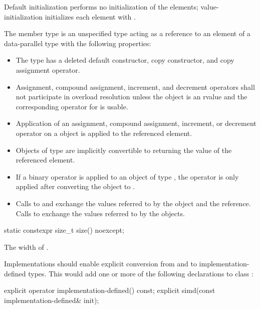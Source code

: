 \pnum Default initialization performs no initialization of the elements; value-initialization initializes each element with .

\pnum The member type  is an unspecified type acting as a reference to an element of a data-parallel type with the following properties:
\label{sec:reference type}
\begin{itemize}
  \item The type has a deleted default constructor, copy constructor, and copy assignment operator.

  \item Assignment, compound assignment, increment, and decrement operators shall not participate in overload resolution unless the  object is an rvalue and the corresponding operator for  is usable.

  \item Application of an assignment, compound assignment, increment, or decrement operator on a  object is applied to the referenced element.

  \item Objects of type  are implicitly convertible to  returning the value of the referenced element.

  \item If a binary operator is applied to an object of type , the operator is only applied after converting the  object to .

  \item Calls to  and  exchange the values referred to by the  object and the  reference.
  Calls to  exchange the values referred to by the  objects.
\end{itemize}

\begin{itemdecl}
static constexpr size_t size() noexcept;
\end{itemdecl}
\begin{itemdescr}
  \pnum\returns The width of \simd[<T, Abi>].
\end{itemdescr}

\pnum Implementations should enable explicit conversion from and to implementation-defined types.
This would add one or more of the following declarations to class \simd:
\begin{itemdecl}
  explicit operator implementation-defined() const;
  explicit simd(const implementation-defined& init);
\end{itemdecl}

